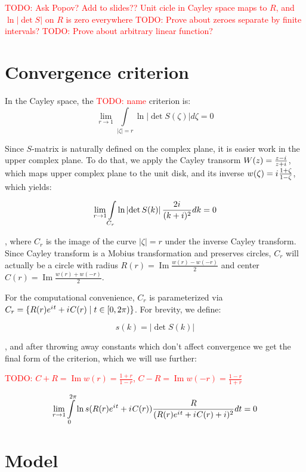 \documentclass[12pt, a4paper]{article}
\newcommand{\abs}[1]{\left| #1 \right|}
\newcommand{\eexp}[1]{e^{#1}}
\newcommand{\iu}{{i\mkern1mu}}
\renewcommand{\Im}{\operatorname{Im}}
\newcommand{\todo}[1]{{\large \textcolor{red}{TODO: #1}}}
\begin{document}
\todo{Ask Popov? Add to slides?? Unit cicle in Cayley space maps to $R$, and $\ln\abs{\det S}$ on $R$ is zero everywhere}
\todo{Prove about zeroes separate by finite intervals?}
\todo{Prove about arbitrary linear function?}


\section{Convergence criterion}

In the Cayley space, the \todo{name} criterion is:
\[
\lim\limits_{r \to 1} \int\limits_{\abs{\zeta} = r} \ln \abs{\det S(\zeta)} d\zeta = 0
\]

Since $S$-matrix is naturally defined on the complex plane, it is easier work in the upper complex plane. To do that, we apply the Cayley transorm $W(z) = \frac{z - \iu}{z + \iu}$, which maps upper complex plane to the unit disk, and its inverse $w(\zeta) = \iu \frac{1 + \zeta}{1 - \zeta}$, which yields:

\begin{equation}\label{crit}
\lim\limits_{r \to 1} \int\limits_{C_r} \ln \abs{\det S(k)} \frac{2 \iu}{(k + i)^2} dk = 0
\end{equation}

, where $C_r$ is the image of the curve $\abs{\zeta} = r$ under the inverse Cayley transform. Since Cayley transform is a Mobius transformation and preserves circles, $C_r$ will actually be a circle with radius $R(r) = \Im \frac{w(r) - w(-r)}{2}$ and center $C(r) = \Im \frac{w(r) + w(-r)}{2}$.

For the computational convenience, $C_r$ is parameterized via $C_r = \{R(r) \eexp{\iu t} + \iu C(r) \mid t \in [0, 2 \pi)\}$. For brevity, we define:

\[
s(k) = \abs{\det S(k)}
\]

, and after throwing away constants which don't affect convergence we get the final form of the criterion, which we will use further:

\todo{$C + R = \Im w(r) = \frac{1 + r}{1 - r}$, $C - R = \Im w(-r) = \frac{1 - r}{1 + r}$}

\begin{equation}\label{critp}
\lim\limits_{r \to 1} \int\limits_{0}^{2 \pi} \ln s(R(r) \eexp{\iu t} + \iu C(r)) \frac{R}{(R(r) \eexp{\iu t} + \iu C(r) + i)^2} dt = 0
\end{equation}

\section{Model}
\end{document}
